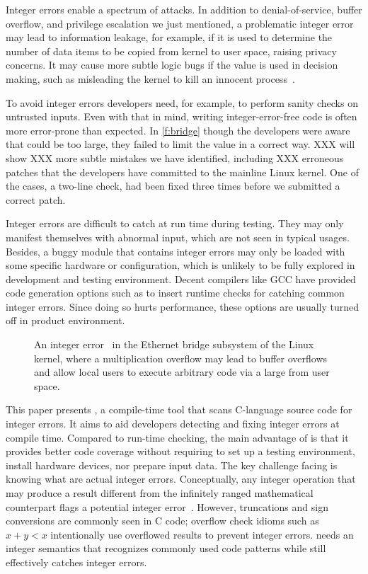 Integer errors enable a spectrum of attacks.  In addition to
denial-of-service, buffer overflow, and privilege escalation we
just mentioned, a problematic integer error may lead to information
leakage, for example, if it is used to determine the number of data
items to be copied from kernel to user space, raising privacy
concerns.  It may cause more subtle logic bugs if the value is used
in decision making, such as misleading the kernel to kill an innocent
process~\cite[CVE-2011-4097]{cve}.


To avoid integer errors developers need, for example, to perform
sanity checks on untrusted inputs.  Even with that in mind, writing
integer-error-free code is often more error-prone than expected.
In \autoref{f:bridge} though the developers were aware that 
could be too large, they failed to limit the value in a correct
way.  XXX will show XXX more subtle mistakes we have identified,
including XXX erroneous patches that the developers have committed
to the mainline Linux kernel.  One of the cases, a two-line check,
had been fixed three times before we submitted a correct patch.

Integer errors are difficult to catch at run time during testing.
They may only manifest themselves with abnormal input, which are
not seen in typical usages.  Besides, a buggy module that contains
integer errors may only be loaded with some specific hardware or
configuration, which is unlikely to be fully explored in development
and testing environment.  Decent compilers like GCC have provided
code generation options such as  to insert runtime
checks for catching common integer errors.  Since doing so hurts
performance, these options are usually turned off in product
environment.
\fi

\begin{figure}[t]
\centering

\vspace{-1em}
\caption{An integer error~\cite[CVE-2006-5751]{cve} in the Ethernet
bridge subsystem of the Linux kernel, where a multiplication overflow
may lead to buffer overflows and allow local users to execute
arbitrary code via a large  from user space.}
\label{f:bridge}
\end{figure}

This paper presents \sys, a compile-time tool that scans C-language
source code for integer errors.
It aims to aid developers detecting
and fixing integer errors at compile time.  Compared to run-time
checking, the main advantage of \sys is that it provides better
code coverage without requiring to set up a testing environment,
install hardware devices, nor prepare input data.
\fi
The key challenge facing \sys is knowing what are actual integer
errors.  Conceptually, any integer operation that may produce a
result different from the infinitely ranged mathematical counterpart
flags a potential integer error~\cite{air}.  However, truncations
and sign conversions are commonly seen in C code; overflow check
idioms such as $x + y < x$ intentionally use overflowed results to
prevent integer errors.  \sys needs an integer semantics that
recognizes commonly used code patterns while still effectively
catches integer errors.

